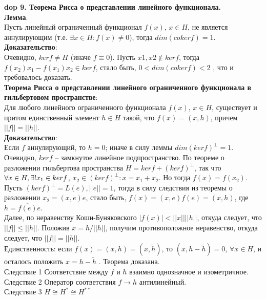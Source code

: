 \textbf{\LARGE dop 9. Теорема Рисса о представлении линейного функционала.}\\


\textbf{Лемма}.\\
Пусть линейный ограниченный функционал $f(x)$, $x \in H$, не является
аннулирующим (т.е. $ \exists x \in H : f(x) \neq 0$), тогда $dim (coker f) = 1$.\\

\textbf{Доказательство}:\\
Очевидно, $ ker f \neq H$ (иначе $f \equiv 0$). Пусть $x1, x2 \not\in ker f$, тогда\\
$f(x_{2})x_{1} - f(x_{1})x_{2} \in ker f$, стало быть, $0 < dim(coker f) < 2$
, что и требовалось доказать.\\

\textbf{Теорема Рисса о представлении линейного ограниченного функционала в
гильбертовом пространстве}:\\
Для любого линейного ограниченного функционала $f(x)$, $x \in H$,
существует и притом единственный элемент $h \in H$ такой, что $f(x)= (x, h)$, причем $||f|| = ||h||$.\\

\textbf{Доказательство}:\\
Если $f$ аннулирующий, то $h = 0$; иначе в силу леммы
$dim(ker f)^{\perp} = 1$. Очевидно, $ker f$ – замкнутое линейное подпространство. По теореме о
разложении гильбертова пространства $H = ker f + (ker f)^{\perp}$, так что $\forall x \in H, \exists! \space x_{1} \in ker f$,
$x_{2} \in (ker f)^{\perp} : x = x_{1} + x_{2}$. Но тогда $f(x) = f(x_{2})$. Пусть $(ker f)^{\perp} = L(e), ||e|| = 1$, тогда в силу следствия из теоремы о разложении $x_{2} = (x, e)e$, стало быть, $f(x) = (x,e)f(e) = (x, h)$, где $h = \overline{f(e)} e$.\\
Далее, по неравенству Коши-Буняковского $|f(x)| < ||x|| ||h||$, откуда следует, что $||f|| \leq ||h||$. Положив $x = h / ||h||$, получим противоположное неравенство, откуда следует, что $||f|| = ||h||$.\\
Единственность: если $f(x) = (x, h) = (x, \tilde h)$, то $(x, h - \tilde h) = 0$, $\forall x \in H$, и осталось положить $x = h - \tilde h$ . Теорема доказана.\\

Следствие 1 Соответствие между $f$ и $h$ взаимно однозначное и изометричное.\\
Следствие 2 Оператор соответствия $f \rightarrow h$ антилинейный.\\
Следствие 3 $H \cong H^{*} \cong H^{**}$
